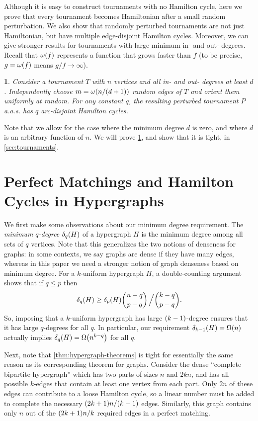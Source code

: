 \documentclass[11pt,english]{article}
\theoremstyle{plain}
\newtheorem{thm}{\protect\theoremname}
\theoremstyle{definition}
\theoremstyle{definition}
\theoremstyle{plain}
\theoremstyle{plain}
\theoremstyle{plain}
\theoremstyle{plain}
\theoremstyle{remark}
\theoremstyle{remark}
\let\originalleft\left
\let\originalright\right
\renewcommand{\left}{\mathopen{}\mathclose\bgroup\originalleft}
\renewcommand{\right}{\aftergroup\egroup\originalright}
\providecommand{\theoremname}{Theorem}
\begin{document}
Although it is easy to construct tournaments with no Hamilton cycle, here we prove 
that every tournament becomes Hamiltonian after a small random perturbation. We also
show that randomly perturbed tournaments are not just Hamiltonian,
but have multiple edge-disjoint Hamilton cycles.
Moreover, we can give stronger results
for tournaments with large minimum in- and out- degrees. 
Recall that $\omega\left(f\right)$ represents a function that grows faster than 
$f$ (to be precise, $g=\omega\left(f\right)$ means $g/f\to\infty$).
\begin{thm}
\label{thm:tournament}Consider a tournament $T$ with $n$ vertices
and all in- and out- degrees at least $d$. Independently choose
$m=\omega\left(n/\left(d+1\right)\right)$ random edges of $T$ and orient them uniformly at random.
For any constant $q$, the resulting perturbed tournament $P$ a.a.s.{} has $q$ arc-disjoint
Hamilton cycles.
\end{thm}

Note that we allow for the case where the minimum degree $d$ is zero, and where $d$ is an arbitrary function of $n$. We will prove \ref{thm:tournament}, and show that it is tight, in \ref{sec:tournaments}.


\section{\label{sec:hypergraphs}Perfect Matchings and Hamilton Cycles in
Hypergraphs}

We first make some observations about our minimum degree requirement.
The \emph{minimum $q$-degree} $\delta_{q}\left(H\right)$ of a hypergraph $H$
is the minimum degree among all sets of $q$ vertices. Note that this
generalizes the two notions of denseness for graphs: in some contexts,
we say graphs are dense if they have many edges,
whereas in this paper we need a stronger notion of graph denseness
based on minimum degree. For a $k$-uniform hypergraph
$H$, a double-counting argument shows that if $q\le p$ then
\[
\delta_{q}\left(H\right)\ge\delta_{p}\left(H\right){n-q \choose p-q}\left.\vphantom{\sum}\right/{k-q \choose p-q}.
\]
So, imposing that a $k$-uniform hypergraph has large $\left(k-1\right)$-degree
ensures that it has large $q$-degrees for all $q$. In particular,
our requirement $\delta_{k-1}\left(H\right)=\Omega\left(n\right)$
actually implies $\delta_{q}\left(H\right)=\Omega\left(n^{k-q}\right)$
for all $q$.

Next, note that \ref{thm:hypergraph-theorems} is tight for essentially
the same reason as its corresponding theorem for graphs. Consider the dense ``complete
bipartite hypergraph'' which has two parts of sizes $n$ and
$2kn$, and has all possible $k$-edges that contain at least one
vertex from each part. Only $2n$ of these edges can contribute
to a loose Hamilton cycle, so a linear number must be added to complete
the necessary $\left(2k+1\right)n/\left(k-1\right)$ edges. Similarly, this graph contains only $n$ out of the $\left(2k+1\right)n/k$ required edges in a perfect matching.
\end{document}
